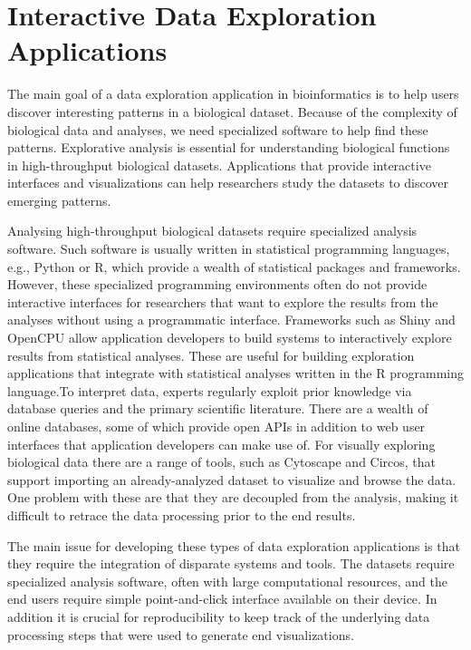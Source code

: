 \chapter{Interactive Data Exploration Applications}\label{interactive}
The main goal of a data exploration application in bioinformatics is to help
users discover interesting patterns in a biological dataset. Because of the
complexity of biological data and analyses, we need specialized software to help
find these patterns. Explorative analysis is essential for understanding
biological functions in high-throughput biological datasets. Applications that
provide interactive interfaces and visualizations can help researchers study the
datasets to discover emerging patterns. 

Analysing high-throughput biological datasets require specialized analysis
software.  Such software is usually written in statistical programming
languages, e.g., Python or R, which provide a wealth of statistical packages and
frameworks. However, these specialized programming environments often do not
provide interactive interfaces for researchers that want to explore the results
from the analyses without using a programmatic interface.  Frameworks such as
Shiny\cite{shiny} and OpenCPU\cite{opencpu} allow application developers to
build systems to interactively explore results from statistical analyses. These
are useful for building exploration applications that integrate with statistical
analyses written in the R programming language.To interpret data, experts
regularly exploit prior knowledge via database queries and the primary
scientific literature. There are a wealth of online databases, some of which
provide open APIs in addition to web user interfaces that application developers
can make use of. For visually exploring biological data there are a range of
tools, such as Cytoscape\cite{cytoscape} and Circos\cite{circos}, that support
importing an already-analyzed dataset to visualize and browse the data. One
problem with these are that they are decoupled from the analysis, making it
difficult to retrace the data processing prior to the end results.  

The main issue for developing these types of data exploration applications is
that they require the integration of disparate systems and tools. The datasets
require specialized analysis software, often with large computational resources,
and the end users require simple point-and-click interface available on their
device. In addition it is crucial for reproducibility to keep track of the 
underlying data processing steps that were used to generate end visualizations. 

